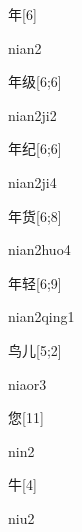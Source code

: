 \begin{verbete}[nian2]{年}[6]
\begin{pronuncia}{nian2}
\end{pronuncia}
\end{verbete}

\begin{verbete}[nian2ji2]{年级}[6;6]
\begin{pronuncia}{nian2ji2}
\end{pronuncia}
\end{verbete}

\begin{verbete}[nian2ji4]{年纪}[6;6]
\begin{pronuncia}{nian2ji4}
\end{pronuncia}
\end{verbete}

\begin{verbete}{年货}[6;8]
\begin{pronuncia}{nian2huo4}
\end{pronuncia}
\end{verbete}

\begin{verbete}{年轻}[6;9]
\begin{pronuncia}{nian2qing1}
\end{pronuncia}
\end{verbete}

\begin{verbete}[niaor3]{鸟儿}[5;2]
\begin{pronuncia}{niaor3}
\end{pronuncia}
\end{verbete}

\begin{verbete}[nin2]{您}[11]
\begin{pronuncia}{nin2}
\end{pronuncia}
\end{verbete}

\begin{verbete}[niu2]{牛}[4]
\begin{pronuncia}{niu2}
\end{pronuncia}
\end{verbete}

